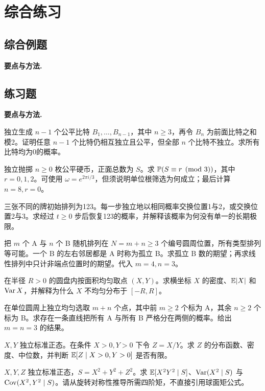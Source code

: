 \chapter{综合练习}
\section{综合例题}
\noindent\textbf{要点与方法.}\enspace




\section{练习题}
\noindent\textbf{要点与方法.}\enspace



独立生成 $n-1$ 个公平比特 $B_1,\ldots,B_{n-1}$，其中 $n\ge3$，再令 $B_n$ 为前面比特之和模2。证明任意 $n-1$ 个比特仍相互独立且公平，但全部 $n$ 个比特不独立。求所有比特均为0的概率。

独立抛掷 $n\ge0$ 枚公平硬币，正面总数为 $S$。求 $\mathbb{P}(S\equiv r\pmod3)$，其中 $r=0,1,2$。可使用 $\omega=e^{2\pi i/3}$，但须说明单位根筛选为何成立；最后计算 $n=8,r=0$。

三张不同的牌初始排列为123。每一步独立地以相同概率交换位置1与2，或交换位置2与3。求经过 $t\ge0$ 步后恢复123的概率，并解释该概率为何没有单一的长期极限。

把 $m$ 个 A 与 $n$ 个 B 随机排列在 $N=m+n\ge3$ 个编号圆周位置，所有类型排列等可能。一个 B 的左右邻居都是 A 时称为孤立 B。求孤立 B 数的期望；再求线性排列中只计非端点位置时的期望。代入 $m=4,n=3$。

在半径 $R>0$ 的圆盘内按面积均匀取点 $(X,Y)$。求横坐标 $X$ 的密度、$\mathbb{E}|X|$ 和 $\operatorname{Var} X$，并解释为什么 $X$ 不均匀分布于 $[-R,R]$。

在单位圆周上独立均匀选取 $m+n$ 个点，其中前 $m\ge2$ 个标为 A，其余 $n\ge2$ 个标为 B。求存在一条直线把所有 A 与所有 B 严格分在两侧的概率。给出 $m=n=3$ 的结果。

$X,Y$ 独立标准正态。在条件 $X>0,Y>0$ 下令 $Z=X/Y$。求 $Z$ 的分布函数、密度、中位数，并判断 $\mathbb{E}[Z\mid X>0,Y>0]$ 是否有限。

$X,Y,Z$ 独立标准正态，$S=X^2+Y^2+Z^2$。求 $\mathbb{E}[X^2Y^2\mid S]$、$\operatorname{Var}(X^2\mid S)$ 与 $\operatorname{Cov}(X^2,Y^2\mid S)$。请从旋转对称性推导所需四阶矩，不直接引用球面矩公式。

